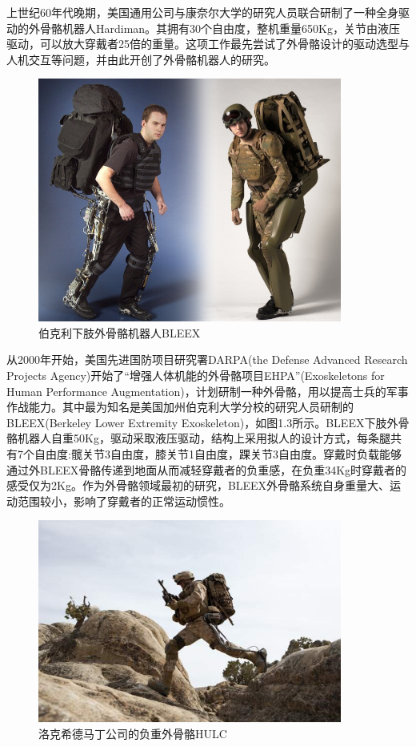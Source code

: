 上世纪60年代晚期，美国通用公司与康奈尔大学的研究人员联合研制了一种全身驱动的外骨骼机器人Hardiman\cite{p6}。其拥有30个自由度，整机重量650Kg，关节由液压驱动，可以放大穿戴者25倍的重量。这项工作最先尝试了外骨骼设计的驱动选型与人机交互等问题，并由此开创了外骨骼机器人的研究。

\begin{figure}[htb]
    \includegraphics[width=10cm]{fig/f5_BLEEX.jpg}
    \caption{伯克利下肢外骨骼机器人BLEEX\cite{p5,p7}}
    \label{fig:mark}
\end{figure}

从2000年开始，美国先进国防项目研究署DARPA(the Defense Advanced Research Projects Agency)开始了“增强人体机能的外骨骼项目EHPA”(Exoskeletons for Human Performance Augmentation)，计划研制一种外骨骼，用以提高士兵的军事作战能力。其中最为知名是美国加州伯克利大学分校的研究人员研制的BLEEX\cite{p5,p7}(Berkeley Lower Extremity Exoskeleton)，如图1.3所示。BLEEX下肢外骨骼机器人自重50Kg，驱动采取液压驱动，结构上采用拟人的设计方式，每条腿共有7个自由度:髋关节3自由度，膝关节1自由度，踝关节3自由度。穿戴时负载能够通过外BLEEX骨骼传递到地面从而减轻穿戴者的负重感，在负重34Kg时穿戴者的感受仅为2Kg。作为外骨骼领域最初的研究，BLEEX外骨骼系统自身重量大、运动范围较小，影响了穿戴者的正常运动惯性。

\begin{figure}[htb]
    \includegraphics[width=10cm]{fig/f5_HULC.jpg}
    \caption{洛克希德马丁公司的负重外骨骼HULC\cite{p10}}
    \label{fig:mark}
\end{figure}

